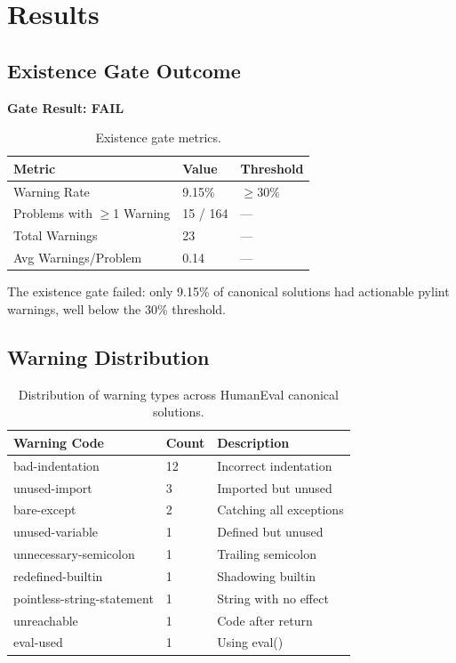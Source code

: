 \section{Results}

\subsection{Existence Gate Outcome}

\textbf{Gate Result: FAIL}

\begin{table}[h]
\centering
\caption{Existence gate metrics.}
\label{tab:gate-results}
\begin{tabular}{@{}lll@{}}
\toprule
Metric & Value & Threshold \\
\midrule
Warning Rate & 9.15\% & $\geq$30\% \\
Problems with $\geq$1 Warning & 15 / 164 & --- \\
Total Warnings & 23 & --- \\
Avg Warnings/Problem & 0.14 & --- \\
\bottomrule
\end{tabular}
\end{table}

The existence gate failed: only 9.15\% of canonical solutions had actionable pylint warnings, well below the 30\% threshold.

\subsection{Warning Distribution}

\begin{table}[h]
\centering
\caption{Distribution of warning types across HumanEval canonical solutions.}
\label{tab:warning-dist}
\begin{tabular}{@{}lll@{}}
\toprule
Warning Code & Count & Description \\
\midrule
bad-indentation & 12 & Incorrect indentation \\
unused-import & 3 & Imported but unused \\
bare-except & 2 & Catching all exceptions \\
unused-variable & 1 & Defined but unused \\
unnecessary-semicolon & 1 & Trailing semicolon \\
redefined-builtin & 1 & Shadowing builtin \\
pointless-string-statement & 1 & String with no effect \\
unreachable & 1 & Code after return \\
eval-used & 1 & Using eval() \\
\bottomrule
\end{tabular}
\end{table}

